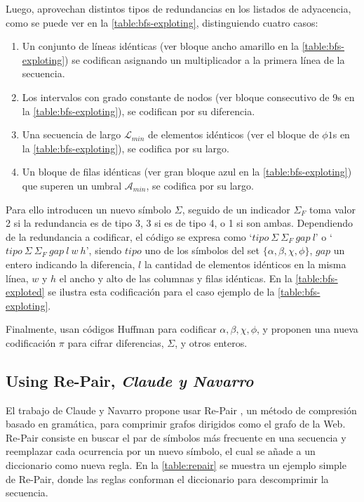 

Luego, aprovechan distintos tipos de redundancias en los listados de adyacencia, como se puede ver en la \autoref{table:bfs-exploting}, distinguiendo cuatro casos:

\begin{enumerate}
	\item Un conjunto de líneas idénticas (ver bloque ancho amarillo en la \autoref{table:bfs-exploting}) se codifican asignando un multiplicador a la primera línea de la secuencia.
	\item Los intervalos con grado constante de nodos (ver bloque consecutivo de 9s en la \autoref{table:bfs-exploting}), se codifican por su diferencia.
	\item Una secuencia de largo $\mathcal{L}_{min}$ de elementos idénticos (ver el bloque de $\phi1$s en la \autoref{table:bfs-exploting}), se codifica por su largo.
	\item Un bloque de filas idénticas (ver gran bloque azul en la \autoref{table:bfs-exploting}) que superen un umbral $\mathcal{A}_{min}$, se codifica por su largo.
\end{enumerate}



Para ello introducen un nuevo símbolo $\Sigma$, seguido de un indicador $\Sigma_{F}$ toma valor 2 si la redundancia es de tipo 3, 3 si es de tipo 4, o 1 si son ambas. Dependiendo de la redundancia a codificar, el código se expresa como `$tipo\:\Sigma\:\Sigma_{F}\:gap\:l$'  o `$tipo\:\Sigma\:\Sigma_{F}\:gap\:l\:w\:h$', siendo $tipo$ uno de los símbolos del set $\{\alpha, \beta, \chi, \phi\}$, $gap$ un entero indicando la diferencia, $l$ la cantidad de elementos idénticos en la misma línea, $w$ y $h$ el ancho y alto de las columnas y filas idénticas. En la \autoref{table:bfs-exploted} se ilustra esta codificación para el caso ejemplo de la \autoref{table:bfs-exploting}.



Finalmente, usan códigos Huffman para codificar $\alpha, \beta, \chi, \phi$, y proponen una nueva codificación $\pi$ para cifrar diferencias, $\Sigma$, y otros enteros.



\subsection{Using Re-Pair, \textit{Claude y Navarro}}
El trabajo de Claude y Navarro \cite{claude2010fast} propone usar Re-Pair \cite{larsson2000off}, un método de compresión basado en gramática, para comprimir grafos dirigidos como el grafo de la Web. Re-Pair consiste en buscar el par de símbolos más frecuente en una secuencia y reemplazar cada ocurrencia por un nuevo símbolo, el cual se añade a un diccionario como nueva regla. En la \autoref{table:repair} se muestra un ejemplo simple de Re-Pair, donde las reglas conforman el diccionario para descomprimir la secuencia.

